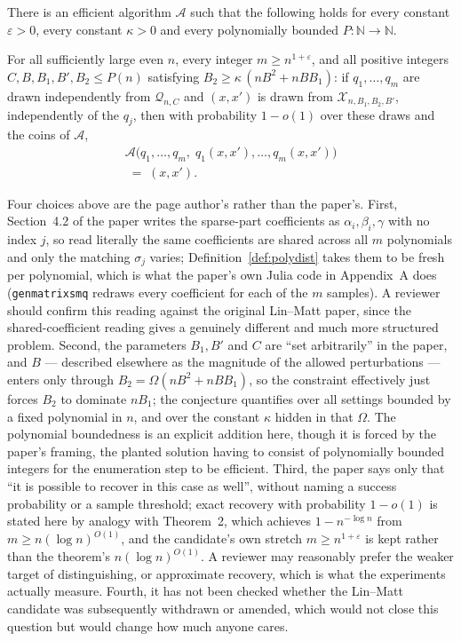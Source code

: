 \documentclass{aicr-conjecture}
\newcommand{\NN}{\mathbb{N}}
\newcommand{\cA}{\mathcal{A}}
\newcommand{\cQ}{\mathcal{Q}}
\newcommand{\cX}{\mathcal{X}}
\begin{document}
\begin{conjecture}\label{conj:main}
There is an efficient algorithm $\cA$ such that the following holds for
every constant $\varepsilon > 0$, every constant $\kappa > 0$ and every
polynomially bounded $P : \NN \to \NN$.

For all sufficiently large even $n$, every integer
$m \ge n^{1+\varepsilon}$, and all positive integers
$C, B, B_1, B', B_2 \le P(n)$ satisfying
$B_2 \ge \kappa\,(n B^2 + n B B_1)$: if $q_1, \dots, q_m$ are drawn
independently from $\cQ_{n,C}$ and $(x, x')$ is drawn from
$\cX_{n, B_1, B_2, B'}$, independently of the $q_j$, then with
probability $1 - o(1)$ over these draws and the coins of $\cA$,
\begin{multline*}
  \cA\bigl( q_1, \dots, q_m,\;
    q_1(x, x'), \dots, q_m(x, x') \bigr) \\
  \;=\; (x, x') .
\end{multline*}
\end{conjecture}

\begin{remark}\label{rem:readings}
Four choices above are the page author's rather than the paper's.
First, Section~4.2 of the paper writes the sparse-part coefficients as
$\alpha_i, \beta_i, \gamma$ with no index $j$, so read literally the
same coefficients are shared across all $m$ polynomials and only the
matching $\sigma_j$ varies; Definition~\ref{def:polydist} takes them to
be fresh per polynomial, which is what the paper's own Julia code in
Appendix~A does (\texttt{genmatrixsmq} redraws every coefficient for
each of the $m$ samples). A reviewer should confirm this reading
against the original Lin--Matt paper, since the shared-coefficient
reading gives a genuinely different and much more structured problem.
Second, the parameters $B_1, B'$ and $C$ are ``set arbitrarily'' in the
paper, and $B$ --- described elsewhere as the magnitude of the allowed
perturbations --- enters only through
$B_2 = \Omega(n B^2 + n B B_1)$, so the constraint effectively just
forces $B_2$ to dominate $n B_1$; the conjecture quantifies over all
settings bounded by a fixed polynomial in $n$, and over the constant
$\kappa$ hidden in that $\Omega$. The polynomial boundedness is an
explicit addition here, though it is forced by the paper's framing, the
planted solution having to consist of polynomially bounded integers for
the enumeration step to be efficient. Third, the paper says only that
``it is possible to recover in this case as well'', without naming a
success probability or a sample threshold; exact recovery with
probability $1 - o(1)$ is stated here by analogy with Theorem~2, which
achieves $1 - n^{-\log n}$ from $m \ge n(\log n)^{O(1)}$, and the
candidate's own stretch $m \ge n^{1+\varepsilon}$ is kept rather than
the theorem's $n(\log n)^{O(1)}$. A reviewer may reasonably prefer the
weaker target of distinguishing, or approximate recovery, which is what
the experiments actually measure. Fourth, it has not been checked
whether the Lin--Matt candidate was subsequently withdrawn or amended,
which would not close this question but would change how much anyone
cares.
\end{remark}
\end{document}
